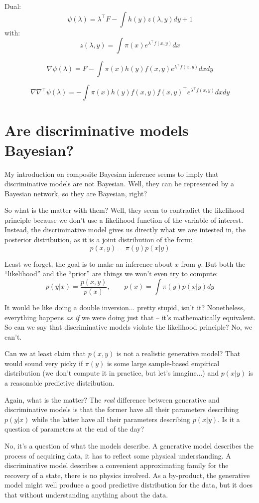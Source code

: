 \documentclass{article}
\begin{document}
Dual:
$$
\psi(\lambda) = \lambda^\top F - \int h(y)z(\lambda, y) dy + 1
$$
with:
$$
z(\lambda,y) = \int \pi(x) e^{\lambda^\top f(x,y)} dx
$$

$$
\nabla\psi(\lambda)
= F - \int \pi(x) h(y) f(x,y) e^{\lambda^\top f(x,y)} dx dy
$$

$$
\nabla\nabla^\top\psi(\lambda)
= - \int \pi(x) h(y) f(x,y)f(x,y)^\top e^{\lambda^\top f(x,y)} dx dy
$$


\section{Are discriminative models Bayesian?}

My introduction on composite Bayesian inference seems to imply that discriminative models are not Bayesian. Well, they can be represented by a Bayesian network, so they are Bayesian, right? 

So what is the matter with them? Well, they seem to contradict the likelihood principle because we don't use a likelihood function of the variable of interest. Instead, the discriminative model gives us directly what we are intested in, the posterior distribution, as it is a joint distribution of the form:
$$
p(x,y) = \pi(y) p(x|y)
$$

Least we forget, the goal is to make an inference about $x$ from $y$. But both the ``likelihood'' and the ``prior'' are things we won't even try to compute: 
$$
p(y|x) = \frac{p(x,y)}{p(x)}, 
\qquad
p(x) = \int \pi(y) p(x|y) dy
$$

It would be like doing a double inversion... pretty stupid, isn't it? Nonetheless, everything happens {\em as if} we were doing just that -- it's mathematically equivalent. So can we say that discriminative models violate the likelihood principle? No, we can't.

Can we at least claim that $p(x,y)$ is not a realistic generative model? That would sound very picky if $\pi(y)$ is some large sample-based empirical distribution (we don't compute it in practice, but let's imagine...) and $p(x|y)$ is a reasonable predictive distribution. 

Again, what is the matter? The {\em real} difference between generative and discriminative models is that the former have all their parameters describing $p(y|x)$ while the latter have all their parameters describing $p(x|y)$. Is it a question of parameters at the end of the day?

No, it's a question of what the models describe. A generative model describes the process of acquiring data, it has to reflect some physical understanding. A discriminative model describes a convenient approximating family for the recovery of a state, there is no physics involved. As a by-product, the generative model might well produce a good predictive distribution for the data, but it does that without understanding anything about the data.
\end{document}
